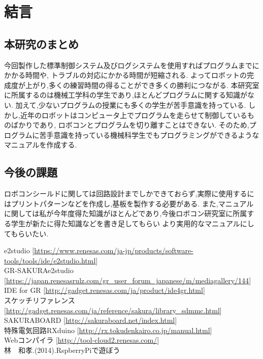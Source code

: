 \documentclass[12pt,oneside]{paper}
\begin{document}
\chapter{結言}
\section{本研究のまとめ}
今回製作した標準制御システム及びログシステムを使用すればプログラムまでにかかる時間や,
トラブルの対応にかかる時間が短縮される.
よってロボットの完成度が上がり,多くの練習時間の得ることができ多くの勝利につながる.
本研究室に所属するのは機械工学科の学生であり,ほとんどプログラムに関する知識がない.
加えて,少ないプログラムの授業にも多くの学生が苦手意識を持っている.
しかし,近年のロボットはコンピュータ上でプログラムを走らせて制御しているものばかりであり,
ロボコンとプログラムを切り離すことはできない.
そのため,プログラムに苦手意識を持っている機械科学生でもプログラミングができるようなマニュアルを作成する.


\section{今後の課題}
ロボコンシールドに関しては回路設計までしかできておらず,実際に使用するにはプリントパターンなどを作成し,基板を製作する必要がある.
また,マニュアルに関しては私が今年度得た知識がほとんどであり,今後ロボコン研究室に所属する学生が新たに得た知識などを書き足してもらい
より実用的なマニュアルにしてもらいたい.


\begin{thebibliography}{8}
e2studio [\url{https://www.renesas.com/ja-jp/products/software-tools/tools/ide/e2studio.html}] \\
GR-SAKURAe2studio [\url{https://japan.renesasrulz.com/gr_user_forum_japanese/m/mediagallery/144}] \\
IDE for GR [\url{http://gadget.renesas.com/ja/product/ide4gr.html}] \\
スケッチリファレンス [\url{http://gadget.renesas.com/ja/reference/sakura/library_sdmmc.html}] \\
SAKURABOARD [\url{http://sakuraboard.net/index.html}] \\
特殊電気回路RXduino [\url{http://rx.tokudenkairo.co.jp/manual.html}] \\
Webコンパイラ [\url{http://tool-cloud2.renesas.com/}] \\
林　和孝.(2014).RspberryPiで遊ぼう
\end{thebibliography}
\end{document}
